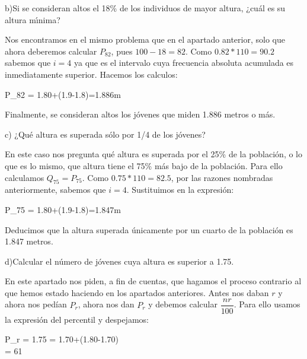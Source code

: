 b)Si se consideran altos el 18\% de los individuos de mayor altura, ¿cuál es su altura mı́nima?

Nos encontramos en el mismo problema que en el apartado anterior, solo que ahora deberemos calcular $P_{82}$, pues $100-18=82$. Como $0.82*110=90.2$ sabemos que $i=4$ ya que es el intervalo cuya frecuencia absoluta acumulada es inmediatamente superior. Hacemos los calculos:
\\
\begin{center}
    \begin{*gather}
        P_{82} = 1.80+(1.9-1.8)=1.886m
    \end{*gather}
\end{center}

Finalmente, se consideran altos los jóvenes que miden 1.886 metros o más.

c) ¿Qué altura es superada sólo por 1/4 de los jóvenes?

En este caso nos pregunta qué altura es superada por el 25\% de la población, o lo que es lo mismo, que altura tiene el 75\% más bajo de la población. Para ello calculamos $Q_{75} = P_{75}$. Como $0.75*110=82.5$, por las razones nombradas anteriormente, sabemos que $i = 4$. Sustituimos en la expresión:
\\
\begin{center}
    \begin{*gather}
        P_{75} = 1.80+(1.9-1.8)=1.847m
    \end{*gather}
\end{center}

Deducimos que la altura superada únicamente por un cuarto de la población es 1.847 metros.

d)Calcular el número de jóvenes cuya altura es superior a 1.75.

En este apartado nos piden, a fin de cuentas, que hagamos el proceso contrario al que hemos estado haciendo en los apartados anteriores. Antes nos daban $r$ y ahora nos pedían $P_{r}$, ahora nos dan $P_{r}$ y debemos calcular $\dfrac{nr}{100}$. Para ello usamos la expresión del percentil y despejamos:
\\
\begin{center}
    \begin{*gather}
        P_{r} = 1.75 = 1.70+(1.80-1.70)\\
         = 61\\
    \end{*gather}
\end{center}


